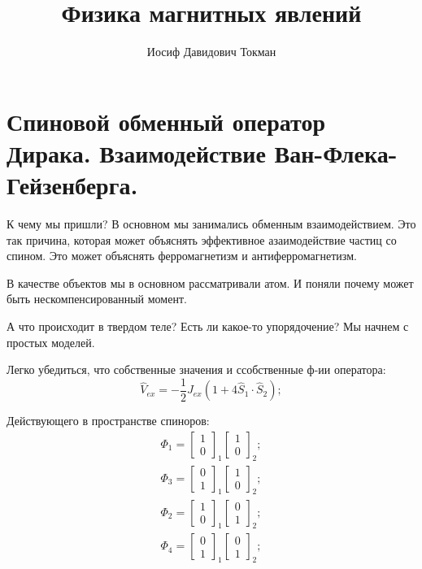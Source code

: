 \documentclass[a4paper, 14pt, russian]{article}
\title{Физика магнитных явлений}
\author{Иосиф Давидович Токман}
\date{}
\newcommand{\be}{\begin{equation}}
\newcommand{\ee}{\end{equation}}
\begin{document}
	\maketitle

	\section{Спиновой обменный оператор Дирака. Взаимодействие Ван-Флека-Гейзенберга.}

	К чему мы пришли? В основном мы занимались обменным взаимодействием. Это так причина,
	которая может объяснять эффективное азаимодействие частиц со спином. Это может объяснять
	ферромагнетизм и антиферромагнетизм.

	В качестве объектов мы в основном рассматривали атом. И поняли почему может быть 
	нескомпенсированный момент.

	А что происходит в твердом теле? Есть ли какое-то упорядочение? Мы начнем с простых моделей.

	Легко убедиться, что собственные значения и ссобственные ф-ии оператора:
	\be
		\label{eq83}
		\hat{V}_{ex} = - \frac{1}{2} J_{ex} ( 1 + 4 \hat{S}_1 \cdot \hat{S}_2);
	\ee

	Действующего в пространстве спиноров:
	\begin{eqnarray}
		\Phi_1 = 
			\begin{bmatrix}
				1 \\ 0
			\end{bmatrix}_1
			\begin{bmatrix}
				1 \\ 0
			\end{bmatrix}_2;\\
		\Phi_3 = 
			\begin{bmatrix}
				0 \\ 1
			\end{bmatrix}_1
			\begin{bmatrix}
				1 \\ 0
			\end{bmatrix}_2;\\
		\Phi_2 = 
			\begin{bmatrix}
				1 \\ 0
			\end{bmatrix}_1
			\begin{bmatrix}
				0 \\ 1
			\end{bmatrix}_2;\\
		\Phi_4 = 
			\begin{bmatrix}
				0 \\ 1
			\end{bmatrix}_1
			\begin{bmatrix}
				0 \\ 1
			\end{bmatrix}_2;
	\end{eqnarray}
\end{document}
